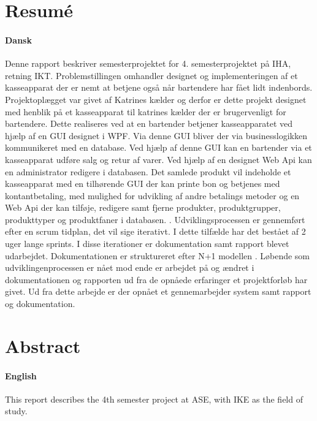 \chapter{Resumé}
\subsubsection*{Dansk}

Denne rapport beskriver semesterprojektet for 4. semesterprojektet på IHA, retning IKT. Problemstillingen omhandler designet og implementeringen af et kasseapparat der er nemt at betjene også når bartendere har fået lidt indenbords. Projektoplægget var givet af Katrines kælder og derfor er dette projekt designet med henblik på et kasseapparat til 
katrines kælder der er brugervenligt for bartendere. 
\newline
\newline
Dette realiseres ved at en bartender betjener kasseapparatet ved hjælp af en \gls{GUI} designet i \gls{WPF}. Via denne \gls{GUI} bliver der via businesslogikken kommunikeret med en database. Ved hjælp af denne \gls{GUI} kan en bartender via et kasseapparat udføre salg og retur af varer. Ved hjælp af en designet   Web Api kan en administrator redigere i databasen. 
\newline
\newline
Det samlede produkt vil indeholde et kasseapparat med en tilhørende \gls{GUI}  der kan printe bon og betjenes med kontantbetaling, med mulighed for udvikling af andre betalings metoder og en Web Api  der kan tilføje, redigere samt fjerne produkter, produktgrupper, produkttyper og produktfaner i databasen. . 
\newline
\newline
Udviklingsprocessen er gennemført efter en scrum tidplan, det vil sige iterativt. I dette tilfælde har det bestået af 2 uger lange sprints. I disse iterationer er dokumentation samt rapport blevet udarbejdet. Dokumentationen er struktureret efter N+1 modellen . Løbende som udviklingenprocessen er nået mod ende er arbejdet på og ændret i dokumentationen og rapporten ud fra de opnåede erfaringer et projektforløb har givet. Ud fra dette arbejde er der opnået et gennemarbejder system samt rapport og dokumentation. 
\newline
\newline
\newline
\newline

\chapter{Abstract}

\subsubsection*{English}

This report describes the 4th semester project at ASE, with IKE as the field of study. 